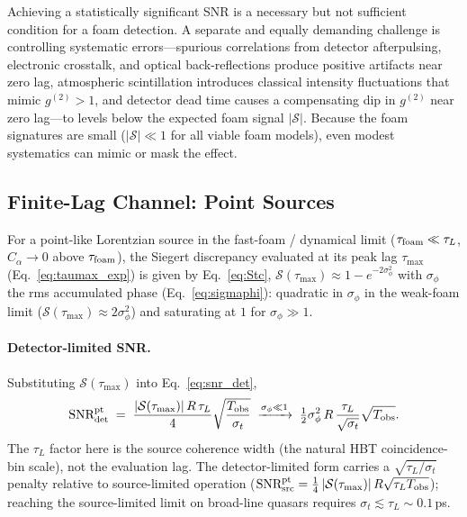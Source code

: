 \documentclass[aps,prd,onecolumn,amsmath,amssymb]{revtex4-2}
\begin{document}
Achieving a statistically significant SNR is a necessary but not sufficient
condition for a foam detection. A separate and equally demanding challenge
is controlling systematic errors---spurious correlations from detector
afterpulsing, electronic crosstalk, and optical back-reflections produce
positive artifacts near zero lag, atmospheric scintillation introduces
classical intensity fluctuations that mimic $g^{(2)}>1$, and detector
dead time causes a compensating dip in $g^{(2)}$ near zero lag---to levels
below the expected foam signal $|\mathcal{S}|$. Because the foam signatures
are small ($|\mathcal{S}|\ll 1$ for all viable foam models), even modest
systematics can mimic or mask the effect.

\subsection{Finite-Lag Channel: Point Sources}
\label{sec:sens-point}

For a point-like Lorentzian source in the fast-foam / dynamical limit
($\tau_{\rm foam}\ll\tau_L$, $C_\alpha\to 0$ above $\tau_{\rm foam}$), the
Siegert discrepancy evaluated at its peak lag $\tau_{\max}$
(Eq.~\eqref{eq:taumax_exp}) is given by Eq.~\eqref{eq:Stc},
$\mathcal{S}(\tau_{\max}) \approx 1 - e^{-2\sigma_\phi^2}$ with
$\sigma_\phi$ the rms accumulated phase (Eq.~\eqref{eq:sigmaphi}): quadratic
in $\sigma_\phi$ in the weak-foam limit
($\mathcal{S}(\tau_{\max})\approx 2\sigma_\phi^2$) and saturating at
$1$ for $\sigma_\phi\gg 1$.

\paragraph{Detector-limited SNR.}
Substituting $\mathcal{S}(\tau_{\max})$ into Eq.~\eqref{eq:snr_det},
\begin{equation}
\textrm{SNR}_{\rm det}^{\rm pt}
\;=\; \frac{|\mathcal{S}(\tau_{\max})|\,R\,\tau_L}{4}\sqrt{\frac{T_{\rm obs}}{\sigma_t}}
\;\xrightarrow{\sigma_\phi\ll 1}\;
\tfrac{1}{2}\sigma_\phi^2\, R\,\frac{\tau_L}{\sqrt{\sigma_t}}\sqrt{T_{\rm obs}}.
\label{eq:snr_det_pt}
\end{equation}
The $\tau_L$ factor here is the source coherence width (the natural HBT
coincidence-bin scale), not the evaluation lag.
The detector-limited form carries a $\sqrt{\tau_L/\sigma_t}$ penalty relative
to source-limited operation
($\textrm{SNR}_{\rm src}^{\rm pt} = \tfrac{1}{4}\,|\mathcal{S}(\tau_{\max})|\,R\sqrt{\tau_L T_{\rm obs}}$);
reaching the source-limited limit on broad-line quasars requires
$\sigma_t \lesssim \tau_L \sim 0.1$\,ps.
\end{document}
